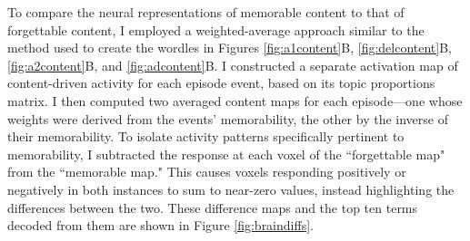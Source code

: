 \documentclass{article}
\begin{document}



To compare the neural representations of memorable content to that of forgettable content, I employed a weighted-average approach similar to the method used to create the wordles in Figures \ref{fig:a1content}B, \ref{fig:delcontent}B, \ref{fig:a2content}B, and \ref{fig:adcontent}B.  I constructed a separate activation map of content-driven activity for each episode event, based on its topic proportions matrix.  I then computed two averaged content maps for each episode—one whose weights were derived from the events' memorability, the other by the inverse of their memorability.  To isolate activity patterns specifically pertinent to memorability, I subtracted the response at each voxel of the ``forgettable map" from the ``memorable map." This causes voxels responding positively or negatively in both instances to sum to near-zero values, instead highlighting the differences between the two.  These difference maps and the top ten terms decoded from them are shown in Figure \ref{fig:braindiffs}.  
\end{document}
